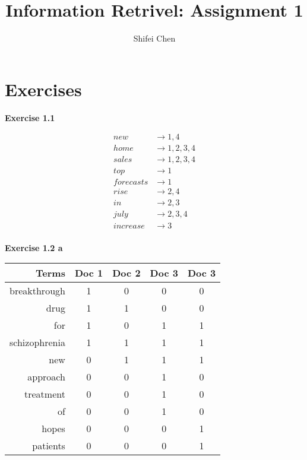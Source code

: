 \documentclass[11pt]{article} %
\title{{\LARGE Information Retrivel: Assignment 1}\\[1.5mm]} %
\author{Shifei Chen} %
\begin{document}
\maketitle

\section{Exercises}

\noindent\textbf{Exercise 1.1}

\begin{align*}
    new &\rightarrow 1, 4\\
    home &\rightarrow 1, 2, 3, 4\\
    sales &\rightarrow 1, 2, 3, 4\\
    top &\rightarrow 1\\
    forecasts &\rightarrow 1\\
    rise &\rightarrow 2, 4\\
    in &\rightarrow 2, 3\\
    july &\rightarrow 2, 3, 4\\
    increase &\rightarrow 3\\
\end{align*}

\noindent\textbf{Exercise 1.2 a}

\begin{table}[h]
    \begin{center}
        \begin{tabular}{r|c|c|c|c}
            \textbf{Terms} & \textbf{Doc 1} & \textbf{Doc 2} & \textbf{Doc 3} & \textbf{Doc 3}\\
            \hline
            breakthrough & 1 & 0 & 0 & 0\\
            drug & 1 & 1 & 0 & 0\\
            for & 1 & 0 & 1 & 1\\
            schizophrenia & 1 & 1 & 1 & 1\\
            new & 0 & 1 & 1 & 1\\
            approach & 0 & 0 & 1 & 0\\
            treatment & 0 & 0 & 1 & 0\\
            of & 0 & 0 & 1 & 0\\
            hopes & 0 & 0 & 0 & 1\\
            patients & 0 & 0 & 0 & 1\\
        \end{tabular}
    \end{center}
\end{table}
\end{document}
